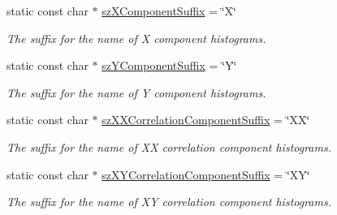 \begin{DoxyCompactItemize}
\mbox{\label{classQn_1_1CorrectionHistogramBase_ae2e4ad018c138678cf7414a8c0008da9}} 
static const char $\ast$ \mbox{\hyperlink{classQn_1_1CorrectionHistogramBase_ae2e4ad018c138678cf7414a8c0008da9}{sz\+X\+Component\+Suffix}} = \char`\"{}X\char`\"{}
\begin{DoxyCompactList}\small\item\em The suffix for the name of X component histograms. \end{DoxyCompactList}\item 
\mbox{\label{classQn_1_1CorrectionHistogramBase_a28d5a401a96737afc53d602672956dcf}} 
static const char $\ast$ \mbox{\hyperlink{classQn_1_1CorrectionHistogramBase_a28d5a401a96737afc53d602672956dcf}{sz\+Y\+Component\+Suffix}} = \char`\"{}Y\char`\"{}
\begin{DoxyCompactList}\small\item\em The suffix for the name of Y component histograms. \end{DoxyCompactList}\item 
\mbox{\label{classQn_1_1CorrectionHistogramBase_ad69c4d9446b39f2be6420c438a119f5a}} 
static const char $\ast$ \mbox{\hyperlink{classQn_1_1CorrectionHistogramBase_ad69c4d9446b39f2be6420c438a119f5a}{sz\+X\+X\+Correlation\+Component\+Suffix}} = \char`\"{}XX\char`\"{}
\begin{DoxyCompactList}\small\item\em The suffix for the name of XX correlation component histograms. \end{DoxyCompactList}\item 
\mbox{\label{classQn_1_1CorrectionHistogramBase_a47beec24d76239facddcb2c8c9073e64}} 
static const char $\ast$ \mbox{\hyperlink{classQn_1_1CorrectionHistogramBase_a47beec24d76239facddcb2c8c9073e64}{sz\+X\+Y\+Correlation\+Component\+Suffix}} = \char`\"{}XY\char`\"{}
\begin{DoxyCompactList}\small\item\em The suffix for the name of XY correlation component histograms. \end{DoxyCompactList}\item 
\mbox{\label{classQn_1_1CorrectionHistogramBase_a4305472e64e86683e259dc5a99256b0b}} 

\end{DoxyCompactItemize}
